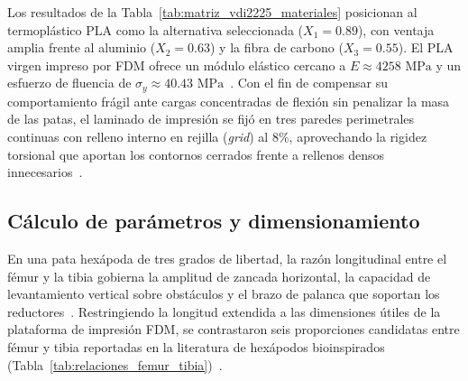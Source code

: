 Los resultados de la Tabla~\ref{tab:matriz_vdi2225_materiales} posicionan al termoplástico PLA como la alternativa seleccionada ($X_1 = 0.89$), con ventaja amplia frente al aluminio ($X_2 = 0.63$) y la fibra de carbono ($X_3 = 0.55$). El PLA virgen impreso por FDM ofrece un módulo elástico cercano a $E \approx 4258\text{ MPa}$ y un esfuerzo de fluencia de $\sigma_y \approx 40.43\text{ MPa}$~\cite{Anderson2017_PLA}. Con el fin de compensar su comportamiento frágil ante cargas concentradas de flexión sin penalizar la masa de las patas, el laminado de impresión se fijó en tres paredes perimetrales continuas con relleno interno en rejilla (\textit{grid}) al $8\%$, aprovechando la rigidez torsional que aportan los contornos cerrados frente a rellenos densos innecesarios~\cite{MahovicPoljacek2025_PLA}.

\subsection{Cálculo de parámetros y dimensionamiento}

En una pata hexápoda de tres grados de libertad, la razón longitudinal entre el fémur y la tibia gobierna la amplitud de zancada horizontal, la capacidad de levantamiento vertical sobre obstáculos y el brazo de palanca que soportan los reductores~\cite{N20_Datasheet}. Restringiendo la longitud extendida a las dimensiones útiles de la plataforma de impresión FDM, se contrastaron seis proporciones candidatas entre fémur y tibia reportadas en la literatura de hexápodos bioinspirados (Tabla~\ref{tab:relaciones_femur_tibia})~\cite{Wu2024_SpiderLegDesign}.

